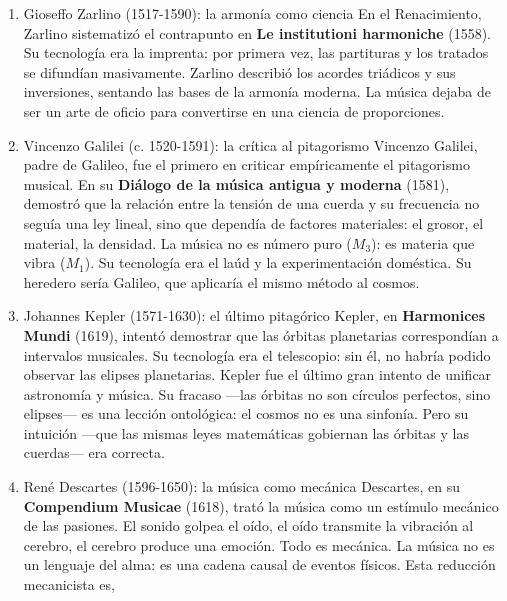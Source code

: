 \documentclass[14pt, a4paper]{article}
\begin{document}
\begin{enumerate}
musical en tetragrama— transformó la música en un objeto de estudio.
Antes de Guido, la música se transmitía oralmente. Después de Guido,
se podía escribir, leer, comparar, analizar. La notación es una
tecnología de fijación que permite la acumulación de conocimiento.
Sin Guido, no hay tratado. Sin tratado, no hay ciencia musical.
\item Gioseffo Zarlino (1517-1590): la armonía como ciencia
\label{zarlino}
En el Renacimiento, Zarlino sistematizó el contrapunto en \textbf{Le
institutioni harmoniche} (1558). Su tecnología era la imprenta: por
primera vez, las partituras y los tratados se difundían masivamente.
Zarlino describió los acordes triádicos y sus inversiones, sentando
las bases de la armonía moderna. La música dejaba de ser un arte de
oficio para convertirse en una ciencia de proporciones.
\item Vincenzo Galilei (c. 1520-1591): la crítica al pitagorismo
\label{vincenzo-puente}
Vincenzo Galilei, padre de Galileo, fue el primero en criticar
empíricamente el pitagorismo musical. En su \textbf{Diálogo de la música
antigua y moderna} (1581), demostró que la relación entre la tensión
de una cuerda y su frecuencia no seguía una ley lineal, sino que
dependía de factores materiales: el grosor, el material, la densidad.
La música no es número puro (\(M_3\)): es materia que vibra (\(M_1\)).
Su tecnología era el laúd y la experimentación doméstica. Su
heredero sería Galileo, que aplicaría el mismo método al cosmos.
\item Johannes Kepler (1571-1630): el último pitagórico
\label{kepler-puente}
Kepler, en \textbf{Harmonices Mundi} (1619), intentó demostrar que las
órbitas planetarias correspondían a intervalos musicales. Su
tecnología era el telescopio: sin él, no habría podido observar las
elipses planetarias. Kepler fue el último gran intento de unificar
astronomía y música. Su fracaso —las órbitas no son círculos
perfectos, sino elipses— es una lección ontológica: el cosmos no es
una sinfonía. Pero su intuición —que las mismas leyes matemáticas
gobiernan las órbitas y las cuerdas— era correcta.
\item René Descartes (1596-1650): la música como mecánica
\label{descartes-puente}
Descartes, en su \textbf{Compendium Musicae} (1618), trató la música como un
estímulo mecánico de las pasiones. El sonido golpea el oído, el oído
transmite la vibración al cerebro, el cerebro produce una emoción.
Todo es mecánica. La música no es un lenguaje del alma: es una cadena
causal de eventos físicos. Esta reducción mecanicista es,

\end{enumerate}
\end{document}
